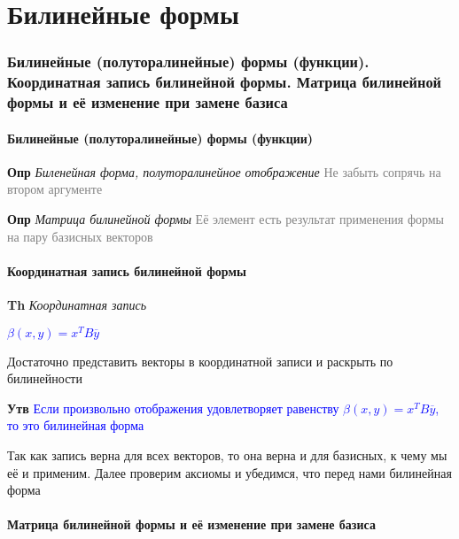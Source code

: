 \documentclass[a4paper, 14pt]{article}
\begin{document}
    

     \part*{Билинейные формы}

    \section{Билинейные (полуторалинейные) формы (функции).
    Координатная запись билинейной формы.
    Матрица билинейной формы и её изменение при замене базиса}

    \subsection{Билинейные (полуторалинейные) формы (функции)}

    \textbf{Опр} \textit{Биленейная форма, полуторалинейное отображение} \textcolor{gray}{Не забыть сопрячь на втором
    аргументе}

    \textbf{Опр} \textit{Матрица билинейной формы} \textcolor{gray}{Её элемент есть результат применения формы на
    пару базисных векторов}

    \subsection{Координатная запись билинейной формы}

    \textbf{Th} \textit{Координатная запись}

    \textcolor{blue}{$\beta (x, y) = x^T B \overline{y}$}

    Достаточно представить векторы в координатной записи и раскрыть по билинейности

    \textbf{Утв} \textcolor{blue}{Если произвольно отображения удовлетворяет
    равенству $\beta (x, y) = x^T B \overline{y}$, то это билинейная форма}

    Так как запись верна для всех векторов, то она верна и для базисных, к чему мы её и применим.
    Далее проверим аксиомы и убедимся, что перед нами билинейная форма

    \subsection{Матрица билинейной формы и её изменение при замене базиса}
\end{document}
